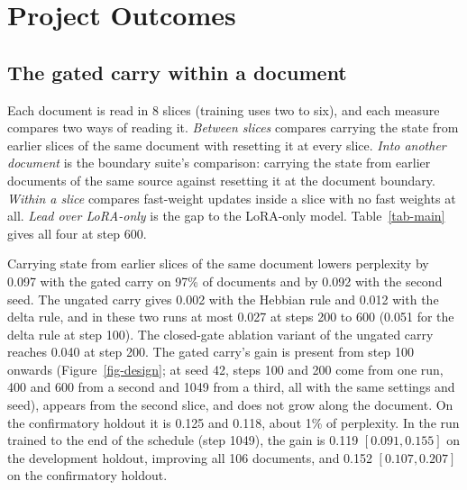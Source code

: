 \documentclass[12pt,a4paper]{report}
\begin{document}
\section{Project Outcomes}

\subsection{The gated carry within a document}
\label{sec-within}

Each document is read in 8 slices (training uses two to six), and each measure compares two ways of reading it. \emph{Between slices} compares carrying the state from earlier slices of the same document with resetting it at every slice. \emph{Into another document} is the boundary suite's comparison: carrying the state from earlier documents of the same source against resetting it at the document boundary. \emph{Within a slice} compares fast-weight updates inside a slice with no fast weights at all. \emph{Lead over LoRA-only} is the gap to the LoRA-only model. Table~\ref{tab-main} gives all four at step 600.

Carrying state from earlier slices of the same document lowers perplexity by 0.097 with the gated carry on 97\% of documents and by 0.092 with the second seed. The ungated carry gives 0.002 with the Hebbian rule and 0.012 with the delta rule, and in these two runs at most 0.027 at steps 200 to 600 (0.051 for the delta rule at step 100). The closed-gate ablation variant of the ungated carry reaches 0.040 at step 200. The gated carry's gain is present from step 100 onwards (Figure~\ref{fig-design}; at seed 42, steps 100 and 200 come from one run, 400 and 600 from a second and 1049 from a third, all with the same settings and seed), appears from the second slice, and does not grow along the document. On the confirmatory holdout it is 0.125 and 0.118, about 1\% of perplexity. In the run trained to the end of the schedule (step 1049), the gain is 0.119 $[0.091, 0.155]$ on the development holdout, improving all 106 documents, and 0.152 $[0.107, 0.207]$ on the confirmatory holdout.
\end{document}
